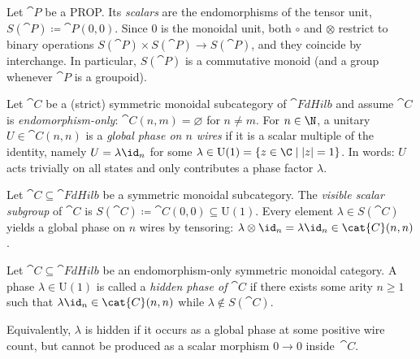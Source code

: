 \begin{definition}\label{def:scalar-in-prop}
Let $\cat{P}$ be a PROP. Its \emph{scalars} are the endomorphisms of the tensor unit,
\(
  S(\cat{P}) \coloneqq \cat{P}(0,0).
\)
Since $0$ is the monoidal unit, both $\circ$ and $\otimes$ restrict to binary operations
\(
  S(\cat{P})\times S(\cat{P})\to S(\cat{P})
\),
and they coincide by interchange.  In particular, $S(\cat{P})$ is a commutative monoid
(and a group whenever $\cat{P}$ is a groupoid).
\end{definition}

\begin{definition}\label{def:global-phase}
Let $ \cat{C}$ be a (strict) symmetric monoidal subcategory of $\cat{FdHilb}$ and assume
$ \cat{C}$ is \emph{endomorphism-only}:
$ \cat{C}(n,m)=\varnothing$ for $n\neq m$.  For $n\in\N$, a unitary
$U\in \cat{C}(n,n)$ is a \emph{global phase on $n$ wires} if it is a scalar multiple of
the identity, namely \(U=\lambda \id_n\) for some
\(\lambda\in\mathrm{U}(1)=\{z\in\C\mid |z|=1\}\).
In words: $U$ acts trivially on all states and only contributes a phase factor $\lambda$.
\end{definition}

\begin{definition}\label{def:visible-scalars}
Let $ \cat{C}\subseteq \cat{FdHilb}$ be a symmetric monoidal subcategory.
The \emph{visible scalar subgroup} of $ \cat{C}$ is
\(
  S( \cat{C}) \coloneqq  \cat{C}(0,0)\subseteq\mathrm{U}(1).
\)
Every element $\lambda\in S( \cat{C})$ yields a global phase on $n$ wires by tensoring:
$\lambda\otimes \id_n = \lambda \id_n\in  \cat{C}(n,n)$.
\end{definition}

\begin{definition}\label{def:hidden-phase}
Let $ \cat{C}\subseteq \cat{FdHilb}$ be an endomorphism-only symmetric monoidal category.
A phase $\lambda\in\mathrm{U}(1)$ is called a \emph{hidden phase of $ \cat{C}$} if there
exists some arity $n\ge 1$ such that $\lambda \id_n\in \cat{C}(n,n)$ while
$\lambda\notin S( \cat{C})$.

Equivalently, $\lambda$ is hidden if it occurs as a global phase at some positive wire count,
but cannot be produced as a scalar morphism $0\to 0$ inside~$ \cat{C}$.
\end{definition}

